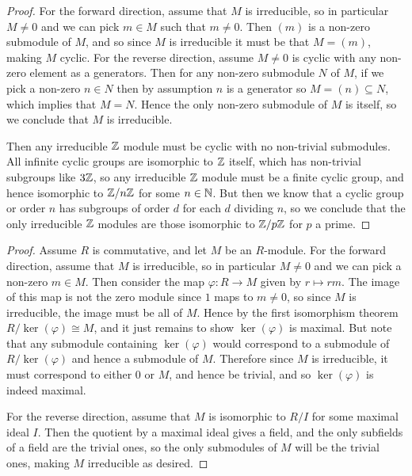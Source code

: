 \documentclass[11pt]{article}
\begin{document}
\begin{proof}
  For the forward direction, assume that $M$ is irreducible, so in particular $M \ne 0$ and we can pick $m \in M$ such that $m \ne 0$.
  Then $(m)$ is a non-zero submodule of $M$, and so since $M$ is irreducible it must be that $M = (m)$, making $M$ cyclic.
  For the reverse direction, assume $M \ne 0$ is cyclic with any non-zero element as a generators.
  Then for any non-zero submodule $N$ of $M$, if we pick a non-zero $n \in N$ then by assumption $n$ is a generator so $M = (n) \subseteq N$, which implies that $M = N$.
  Hence the only non-zero submodule of $M$ is itself, so we conclude that $M$ is irreducible.

  Then any irreducible $\mathbb{Z}$ module must be cyclic with no non-trivial submodules.
  All infinite cyclic groups are isomorphic to $\mathbb{Z}$ itself, which has non-trivial subgroups like $3\mathbb{Z}$, so any irreducible $\mathbb{Z}$ module must be a finite cyclic group, and hence isomorphic to $\mathbb{Z}/n\mathbb{Z}$ for some $n \in \mathbb{N}$.
  But then we know that a cyclic group or order $n$ has subgroups of order $d$ for each $d$ dividing $n$, so we conclude that the only irreducible $\mathbb{Z}$ modules are those isomorphic to $\mathbb{Z}/p\mathbb{Z}$ for $p$ a prime.
\end{proof}

\begin{proof}
  Assume $R$ is commutative, and let $M$ be an $R$-module.
  For the forward direction, assume that $M$ is irreducible, so in particular $M \ne 0$ and we can pick a non-zero $m \in M$.
  Then consider the map $\varphi: R \rightarrow M$ given by $r \mapsto rm$.
  The image of this map is not the zero module since $1$ maps to $m \ne 0$, so since $M$ is irreducible, the image must be all of $M$.
  Hence by the first isomorphism theorem $R/\ker(\varphi) \cong M$, and it just remains to show $\ker(\varphi)$ is maximal.
  But note that any submodule containing $\ker(\varphi)$ would correspond to a submodule of $R/\ker(\varphi)$ and hence a submodule of $M$.
  Therefore since $M$ is irreducible, it must correspond to either $0$ or $M$, and hence be trivial, and so $\ker(\varphi)$ is indeed maximal.

  For the reverse direction, assume that $M$ is isomorphic to $R/I$ for some maximal ideal $I$.
  Then the quotient by a maximal ideal gives a field, and the only subfields of a field are the trivial ones, so the only submodules of $M$ will be the trivial ones, making $M$ irreducible as desired.
\end{proof}
\end{document}
